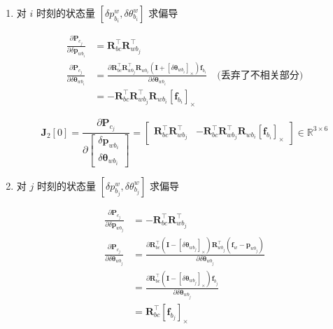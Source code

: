 \documentclass[12pt,a4paper]{article}
\begin{document}
\begin{enumerate}
\begin{enumerate}

\item 对 {\color{blue} $i$ 时刻的状态量 $[\delta p^{w}_{b_{i}},\delta \theta ^{w}_{b_{i}}]$} 求偏导

\begin{equation}
\begin{aligned}
\frac{\partial \mathbf{P}_{c_{j}}}{\partial \delta \mathbf{p}_{w b_{i}}} 
&=
\mathbf{R}_{b c}^{\top} \mathbf{R}_{w b_{j}}^{\top} 
\\
\frac{\partial \mathbf{P}_{c_{j}}}{\partial \delta \boldsymbol{\theta}_{w b_{i}}} 
&=
\frac{\partial \mathbf{R}_{b c}^{\top} \mathbf{R}_{w b_{j}}^{\top} \mathbf{R}_{w b_{i}}\left(\mathbf{I}+\left[\delta \boldsymbol{\theta}_{wb_{i}}\right]_{\times}\right) \mathbf{f}_{b_{i}}}{\partial \delta \boldsymbol{\theta}_{wb_{i}}} 
\quad \text{(丢弃了不相关部分)} \\
&=
-\mathbf{R}_{b c}^{\top} \mathbf{R}_{w b_{j}}^{\top} \mathbf{R}_{w b_{i}}\left[\mathbf{f}_{b_{i}}\right]_{\times}
\end{aligned}
\end{equation}

\begin{equation}
\mathbf{J}_2[0] 
=
\frac{\partial \mathbf{P}_{c_{j}}}
{\partial \left[\begin{array}{c}{\delta \mathbf{p}_{w b_{i}}} \\ 
{\delta \boldsymbol{\theta}_{w b_{i}}}\end{array}\right]} 
=
\begin{bmatrix}
\mathbf{R}_{b c}^{\top} \mathbf{R}_{w b_{j}}^{\top} & 
-\mathbf{R}_{b c}^{\top} \mathbf{R}_{w b_{j}}^{\top} \mathbf{R}_{w b_{i}}\left[\mathbf{f}_{b_{i}}\right]_{\times}
\end{bmatrix}
\in \mathbb{R}^{3 \times 6}
\end{equation}

\item 对 {\color{blue} $j$ 时刻的状态量 $[\delta p^{w}_{b_{j}},\delta \theta ^{w}_{b_{j}}]$} 求偏导

\begin{equation}
\begin{aligned}
\frac{\partial \mathbf{P}_{c_{j}}}{\partial \delta \mathbf{p}_{w b_{j}}} 
&=
-\mathbf{R}_{b c}^{\top} \mathbf{R}_{w b_{j}}^{\top} 
\\
\frac{\partial \mathbf{P}_{c_{j}}}{\partial \delta \boldsymbol{\theta}_{w b_{j}}} 
&=
\frac{\partial \mathbf{R}_{b c}^{\top}\left(\mathbf{I}-\left[\delta \boldsymbol{\theta}_{w b_{j}}\right]_{\times}\right) \mathbf{R}_{w b_{j}}^{\top}\left(\mathbf{f}_{w}-\mathbf{p}_{w b_{j}}\right)}
{\partial \delta \boldsymbol{\theta}_{w b_{j}}} \\
&=
\frac{\partial \mathbf{R}_{b c}^{\top}\left(\mathbf{I}-\left[\delta \boldsymbol{\theta}_{w b_{j}}\right]_{\times}\right) \mathbf{f}_{b_{j}}}
{\partial \delta \boldsymbol{\theta}_{w b_{j}}} \\
&=
\mathbf{R}_{b c}^{\top}\left[\mathbf{f}_{b_{j}}\right]_{\times}
\end{aligned}
\end{equation}


\end{enumerate}
\end{enumerate}
\end{document}
